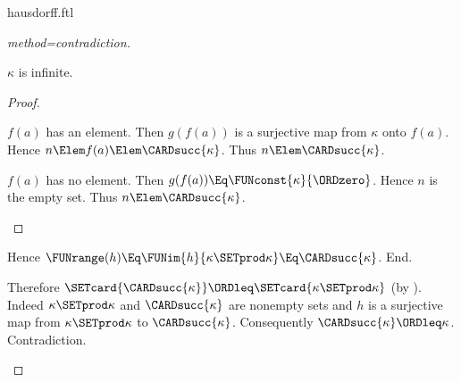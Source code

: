 \documentclass{stex}
\begin{document}
\begin{smodule}{hausdorff.ftl}
\begin{forthel}
\begin{proof}[method=contradiction]
\begin{case}{$\kappa$ is infinite.}
\begin{proof}
          \begin{case}{$f(a)$ has an element.}
            Then $g(f(a))$ is a surjective map from $\kappa$ onto $f(a)$.
            Hence $n \Elem f(a) \Elem \CARDsucc{\kappa}$.
            Thus $n \Elem \CARDsucc{\kappa}$.
          \end{case}
  
          \begin{case}{$f(a)$ has no element.}
            Then $g(f(a)) \Eq \FUNconst{\kappa}{\ORDzero}$.
            Hence $n$ is the empty set.
            Thus $n \Elem \CARDsucc{\kappa}$.
          \end{case}
        \end{proof}
  
        Hence $\FUNrange(h) \Eq \FUNim{h}{\kappa \SETprod \kappa} \Eq \CARDsucc{\kappa}$.
      End.
  
      Therefore $\SETcard{\CARDsucc{\kappa}} \ORDleq \SETcard{\kappa \SETprod \kappa}$ (by ).
      Indeed $\kappa \SETprod \kappa$ and $\CARDsucc{\kappa}$ are nonempty sets and $h$ is a surjective map from $\kappa \SETprod \kappa$ to $\CARDsucc{\kappa}$.
      Consequently $\CARDsucc{\kappa} \ORDleq \kappa$.
      Contradiction.
    \end{case}
  \end{proof}
\end{forthel}

\printbibliography
{}
\end{smodule}
\end{document}
